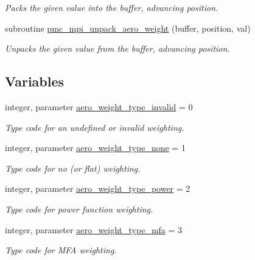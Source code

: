 \begin{DoxyCompactItemize}
\begin{DoxyCompactList}\small\item\em Packs the given value into the buffer, advancing position. \end{DoxyCompactList}\item 
subroutine \mbox{\hyperlink{namespacepmc__aero__weight_a7fbba439d3f5e641d3a417e01e29ee64}{pmc\+\_\+mpi\+\_\+unpack\+\_\+aero\+\_\+weight}} (buffer, position, val)
\begin{DoxyCompactList}\small\item\em Unpacks the given value from the buffer, advancing position. \end{DoxyCompactList}\end{DoxyCompactItemize}
\subsection*{Variables}
\begin{DoxyCompactItemize}
\item 
integer, parameter \mbox{\hyperlink{namespacepmc__aero__weight_aec42d7fe52ae5751fedaa8c0c126d66d}{aero\+\_\+weight\+\_\+type\+\_\+invalid}} = 0
\begin{DoxyCompactList}\small\item\em Type code for an undefined or invalid weighting. \end{DoxyCompactList}\item 
integer, parameter \mbox{\hyperlink{namespacepmc__aero__weight_a8be5b5d0a97167c793448da8b88b7eb5}{aero\+\_\+weight\+\_\+type\+\_\+none}} = 1
\begin{DoxyCompactList}\small\item\em Type code for no (or flat) weighting. \end{DoxyCompactList}\item 
integer, parameter \mbox{\hyperlink{namespacepmc__aero__weight_a9ee33fc5875ba3405147a7fa0c2e90d9}{aero\+\_\+weight\+\_\+type\+\_\+power}} = 2
\begin{DoxyCompactList}\small\item\em Type code for power function weighting. \end{DoxyCompactList}\item 
integer, parameter \mbox{\hyperlink{namespacepmc__aero__weight_a8a21eb439339799883dbe622bfdf74d8}{aero\+\_\+weight\+\_\+type\+\_\+mfa}} = 3
\begin{DoxyCompactList}\small\item\em Type code for M\+FA weighting. \end{DoxyCompactList}\end{DoxyCompactItemize}


